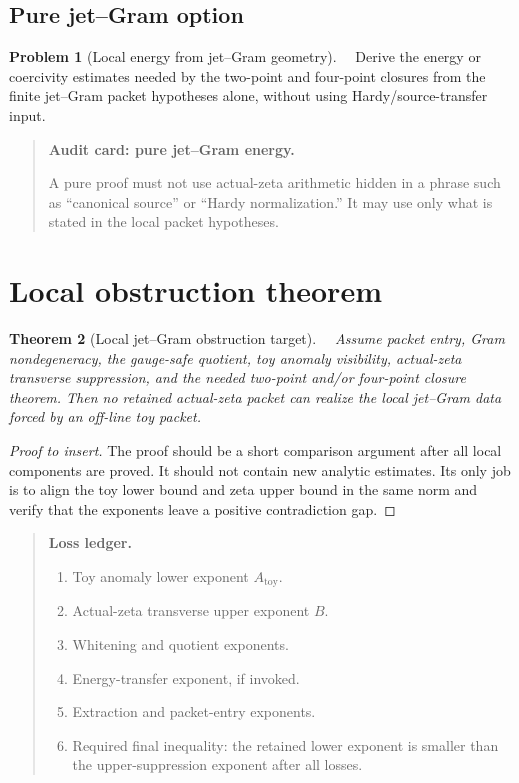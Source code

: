 \documentclass[11pt,a4paper]{amsart}
\newcommand{\Status}[1]{\textnormal{\fbox{\scriptsize\textsf{#1}}}}
\newcommand{\Core}{\Status{CORE}}
\newcommand{\Open}{\Status{OPEN}}
\newcommand{\toy}{\mathrm{toy}}
\theoremstyle{plain}
\newtheorem{theorem}{Theorem}[section]
\theoremstyle{definition}
\newtheorem{problem}[theorem]{Problem}
\newenvironment{audit}[1]{%
  \begin{quote}\noindent\textbf{Audit card: #1.}\par\smallskip\small
}{\end{quote}}
\newenvironment{lossledger}{%
  \begin{quote}\noindent\textbf{Loss ledger.}\par\smallskip\small
  \begin{enumerate}[label=\textup{L\arabic*.},leftmargin=*]
}{\end{enumerate}\end{quote}}
\begin{document}
\subsection{Pure jet--Gram option}
\label{subsec:pure-jetgram-option}

\begin{problem}[Local energy from jet--Gram geometry]
\label{prob:local-energy-from-jetgram}
\Core\ \Open\
Derive the energy or coercivity estimates needed by the two-point and four-point closures from the finite jet--Gram packet hypotheses alone, without using Hardy/source-transfer input.
\end{problem}

\begin{audit}{pure jet--Gram energy}
A pure proof must not use actual-zeta arithmetic hidden in a phrase such as ``canonical source'' or ``Hardy normalization.''  It may use only what is stated in the local packet hypotheses.
\end{audit}

\section{Local obstruction theorem}
\label{sec:local-obstruction-theorem}

\begin{theorem}[Local jet--Gram obstruction target]
\label{thm:local-jetgram-obstruction-target}
\Core\ \Open\
Assume packet entry, Gram nondegeneracy, the gauge-safe quotient, toy anomaly visibility, actual-zeta transverse suppression, and the needed two-point and/or four-point closure theorem.  Then no retained actual-zeta packet can realize the local jet--Gram data forced by an off-line toy packet.
\end{theorem}

\begin{proof}[Proof to insert]
The proof should be a short comparison argument after all local components are proved.  It should not contain new analytic estimates.  Its only job is to align the toy lower bound and zeta upper bound in the same norm and verify that the exponents leave a positive contradiction gap.
\end{proof}

\begin{lossledger}
\item Toy anomaly lower exponent \(A_{\toy}\).
\item Actual-zeta transverse upper exponent \(B\).
\item Whitening and quotient exponents.
\item Energy-transfer exponent, if invoked.
\item Extraction and packet-entry exponents.
\item Required final inequality: the retained lower exponent is smaller than the upper-suppression exponent after all losses.
\end{lossledger}
\end{document}
